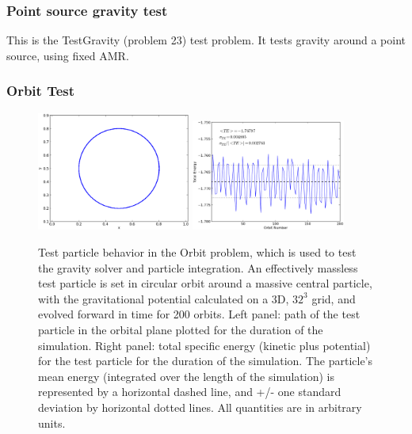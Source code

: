 \subsubsection{Point source gravity test}
\label{sec.test.gravitypointsource}
This is the TestGravity (problem 23) test problem.  It tests gravity around a point source, using fixed AMR.

\subsubsection{Orbit Test}
\label{sec.test.testorbit}

\begin{figure}
\begin{center}
\includegraphics[width=0.45\textwidth]{figures/TestOrbit_xy.eps}
\includegraphics[width=0.45\textwidth]{figures/TestOrbit_TotalEnergy.eps}
\caption{Test particle behavior in the Orbit problem, which is used to
test the gravity solver and particle integration.  An effectively
massless test particle is set in circular orbit around a massive
central particle, with the gravitational potential calculated on a 3D,
$32^3$ grid, and evolved forward in time for 200 orbits.  Left panel:
path of the test particle in the orbital plane plotted for the
duration of the simulation.  Right panel: total specific energy
(kinetic plus potential) for the test particle for the duration of the
simulation.  The particle's mean energy (integrated over the length of
the simulation) is represented by a horizontal dashed line, and +/-
one standard deviation by horizontal dotted lines.  All quantities are
in arbitrary units.}
\label{fig.orbittest}
\end{center}
\end{figure}

